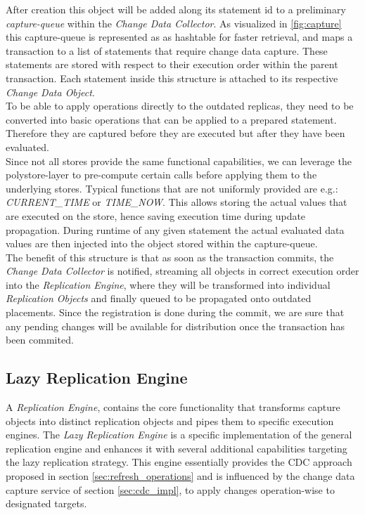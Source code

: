 After creation this object will be added along its statement id to a preliminary \emph{capture-queue} within the \emph{Change Data Collector}. 
As visualized in \ref{fig:capture} this capture-queue is represented as as hashtable for 
faster retrieval, and maps a transaction to a list of statements that require change data capture. 
These statements are stored with respect to their execution order within the parent transaction.
Each statement inside this structure is attached to its respective \emph{Change Data Object}.\\

To be able to apply operations directly to the outdated replicas, they need to be converted into basic operations that can be applied to a prepared statement.
Therefore they are captured before they are executed but after they have been evaluated.\\
Since not all stores provide the same functional capabilities, we can leverage the polystore-layer to pre-compute certain calls before applying them to the underlying stores.
Typical functions that are not uniformly provided are e.g.: \emph{CURRENT\_TIME} or \emph{TIME\_NOW}. This allows storing the actual values that are executed on the store,
hence saving execution time during update propagation.
During runtime of any given statement the actual evaluated data values are then injected into the object stored within the capture-queue.\\
The benefit of this structure is that as soon as the transaction commits, the \emph{Change Data Collector} is notified, streaming all objects in correct execution order
into the \emph{Replication Engine}, where they will be transformed into individual \emph{Replication Objects} and finally queued to be propagated onto outdated placements. 
Since the registration is done during the commit, we are sure that any pending changes will be available for distribution once the transaction has been commited.




\subsection{Lazy Replication Engine}

A \emph{Replication Engine}, contains the core functionality that transforms capture objects into distinct replication objects and 
pipes them to specific execution engines.
The \emph{Lazy Replication Engine} is a specific implementation of the general replication engine and enhances it with several additional capabilities targeting
the lazy replication strategy. This engine essentially provides the CDC approach proposed in section \ref{sec:refresh_operations} and is influenced by the 
change data capture service of section \ref{sec:cdc_impl}, to apply changes operation-wise to designated targets.\\

